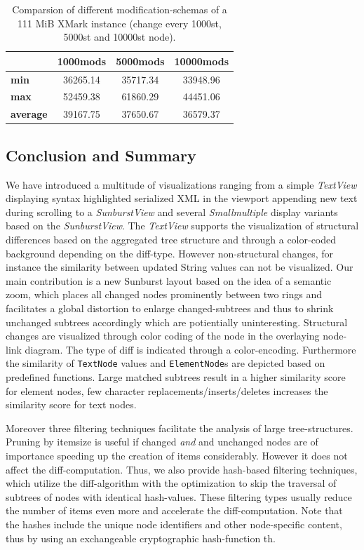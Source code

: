 \begin{table}[tb]
\centering 
\begin{tabular}[r]{|l|c|c|c|} 
\hline
& \textbf{1000mods} & \textbf{5000mods} & \textbf{10000mods}\\
\hline
\hline
\textbf{min} & 36265.14 & 35717.34 & 33948.96\\
\hline
\textbf{max} & 52459.38 & 61860.29 & 44451.06\\
\hline
\textbf{average} & 39167.75 & 37650.67 & 36579.37\\
\hline
\end{tabular}
\label{chap3:comparsion}
\vspace{0.5em} 
\caption{Comparsion of different modification-schemas of a 111 MiB XMark instance (change every 1000st, 5000st and 10000st node).}
\end{table}

\subsection{Conclusion and Summary}
We have introduced a multitude of visualizations ranging from a simple \emph{TextView} displaying syntax highlighted serialized XML in the viewport appending new text during scrolling to a \emph{SunburstView} and several \emph{Smallmultiple} display variants based on the \emph{SunburstView}. The \emph{TextView} supports the visualization of structural differences based on the aggregated tree structure and through a color-coded background depending on the diff-type. However non-structural changes, for instance the similarity between updated String values can not be visualized. Our main contribution is a new Sunburst layout based on the idea of a semantic zoom, which places all changed nodes prominently between two rings and facilitates a global distortion to enlarge changed-subtrees and thus to shrink unchanged subtrees accordingly which are potientially uninteresting. Structural changes are visualized through color coding of the node in the overlaying node-link diagram. The type of diff is indicated through a color-encoding. Furthermore the similarity of \texttt{TextNode} values and \texttt{ElementNode}s are depicted based on predefined functions. Large matched subtrees result in a higher similarity score for element nodes, few character replacements/inserts/deletes increases the similarity score for text nodes.

Moreover three filtering techniques facilitate the analysis of large tree-struc\-tures. Pruning by itemsize is useful if changed \emph{and} and unchanged nodes are of importance speeding up the creation of items considerably. However it does not affect the diff-computation. Thus, we also provide hash-based filtering techniques, which utilize the diff-algorithm with the optimization to skip the traversal of subtrees of nodes with identical hash-values. These filtering types usually reduce the number of items even more and accelerate the diff-computation. Note that the hashes include the unique node identifiers and other node-specific content, thus by using an exchangeable cryptographic hash-function th.  

